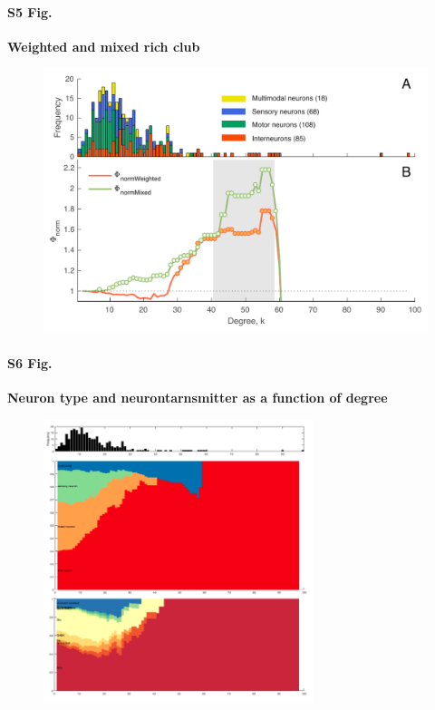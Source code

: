 \documentclass[10pt,letterpaper]{article}
\begin{document}
\paragraph*{S5 Fig.}
{\bf Weighted and mixed rich club}
\begin{figure}[!h]
\label{S6_Fig}
\centering
    \includegraphics[width=1\textwidth]{WeightedMixedRC.pdf}
\end{figure}

\paragraph*{S6 Fig.}
{\bf Neuron type and neurontarnsmitter as a function of degree}
\begin{figure}[!h]
\label{S7_Fig}
\centering
    \includegraphics[width=0.7\textwidth]{TypeTransmitterDegree}
\end{figure}
\end{document}
